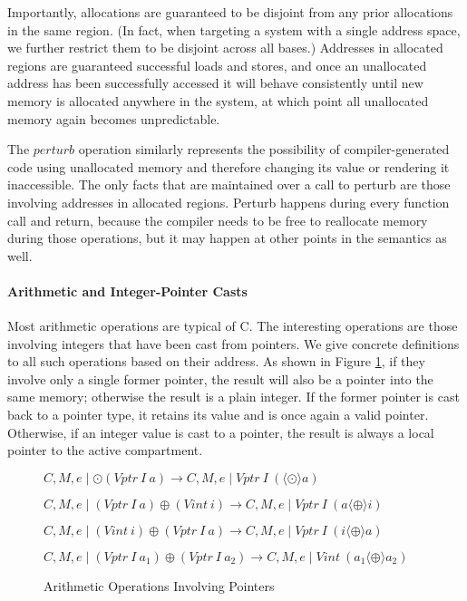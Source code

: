 \documentclass{article}
\begin{document}
Importantly, allocations are guaranteed to be disjoint from any prior allocations in the
same region. (In fact, when targeting a system with a single address space, we further restrict
them to be disjoint across all bases.) Addresses in allocated regions are guaranteed
successful loads and stores, and once an unallocated address has been successfully accessed
it will behave consistently until new memory is allocated anywhere in the system,
at which point all unallocated memory again becomes unpredictable.

The \(\mathit{perturb}\) operation similarly represents the possibility of compiler-generated
code using unallocated memory and therefore changing its value or rendering it inaccessible.
The only facts that are maintained over a call to perturb are those involving addresses in
allocated regions. Perturb happens during every function call and return, because the compiler
needs to be free to reallocate memory during those operations, but it may happen at other
points in the semantics as well.

\paragraph{Arithmetic and Integer-Pointer Casts}

Most arithmetic operations are typical of C. The interesting operations are those
involving integers that have been cast from pointers. We give concrete definitions
to all such operations based on their address. As shown in Figure \ref{fig:arith}, if they
involve only a single former pointer, the result will also be a pointer into the
same memory; otherwise the result is a plain integer. If the former pointer is cast
back to a pointer type, it retains its value and is once again a valid pointer.
Otherwise, if an integer value is cast to a pointer, the result is always a local
pointer to the active compartment.

\begin{figure}
  \judgment[Unop]
           {}
           {\(C,M,e \mid \odot (\mathit{Vptr} ~ I ~ a) \longrightarrow
             C,M,e \mid \mathit{Vptr} ~ I ~ (\langle \odot \rangle a)\)}
           
  \judgment[BinopPointerInteger]
           {}
           {\(C,M,e \mid (\mathit{Vptr} ~ I ~ a) \oplus
             (\mathit{Vint} ~ i) \longrightarrow
             C,M,e \mid \mathit{Vptr} ~ I ~ (a \langle \oplus \rangle i)\)}

  \judgment[BinopIntegerPointer]
           {}
           {\(C,M,e \mid (\mathit{Vint} ~ i) \oplus
             (\mathit{Vptr} ~ I ~ a) \longrightarrow
             C,M,e \mid \mathit{Vptr} ~ I ~ (i \langle \oplus \rangle a)\)}

  \judgment[BinopPointers]
           {}
           {\(C,M,e \mid (\mathit{Vptr} ~ I ~ a_1) \oplus
             (\mathit{Vptr} ~ I ~ a_2) \longrightarrow
             C,M,e \mid \mathit{Vint} ~ (a_1 \langle \oplus \rangle a_2)\)}

  \caption{Arithmetic Operations Involving Pointers}
  \label{fig:arith}
\end{figure}
\end{document}
